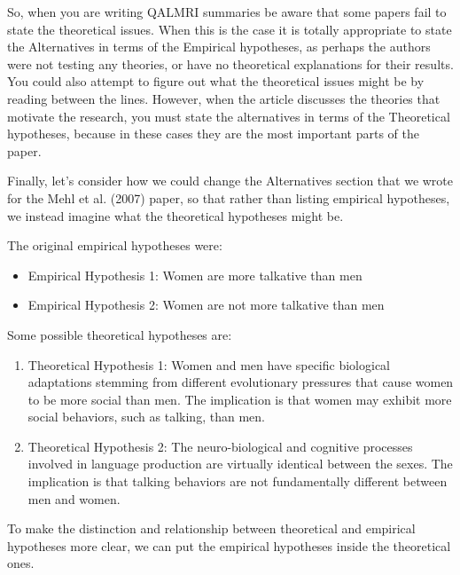 So, when you are writing QALMRI summaries be aware that some papers fail to state the theoretical issues. When this is the case it is totally appropriate to state the Alternatives in terms of the Empirical hypotheses, as perhaps the authors were not testing any theories, or have no theoretical explanations for their results. You could also attempt to figure out what the theoretical issues might be by reading between the lines. However, when the article discusses the theories that motivate the research, you must state the alternatives in terms of the Theoretical hypotheses, because in these cases they are the most important parts of the paper. 

Finally, let's consider how we could change the Alternatives section that we wrote for the Mehl et al. (2007) paper, so that rather than listing empirical hypotheses, we instead imagine what the theoretical hypotheses might be.

The original empirical hypotheses were:

\begin{itemize}
\item Empirical Hypothesis 1: Women are more talkative than men
\item Empirical Hypothesis 2: Women are not more talkative than men
\end{itemize}

Some possible theoretical hypotheses are:

\begin{enumerate}
\item Theoretical Hypothesis 1: Women and men have specific biological adaptations stemming from different evolutionary pressures that cause women to be more social than men. The implication is that women may exhibit more social behaviors, such as talking, than men.
\item Theoretical Hypothesis 2: The neuro-biological and cognitive processes involved in language production are virtually identical between the sexes. The implication is that talking behaviors are not fundamentally different between men and women.
\end{enumerate}

To make the distinction and relationship between theoretical and empirical hypotheses more clear, we can put the empirical hypotheses inside the theoretical ones.

